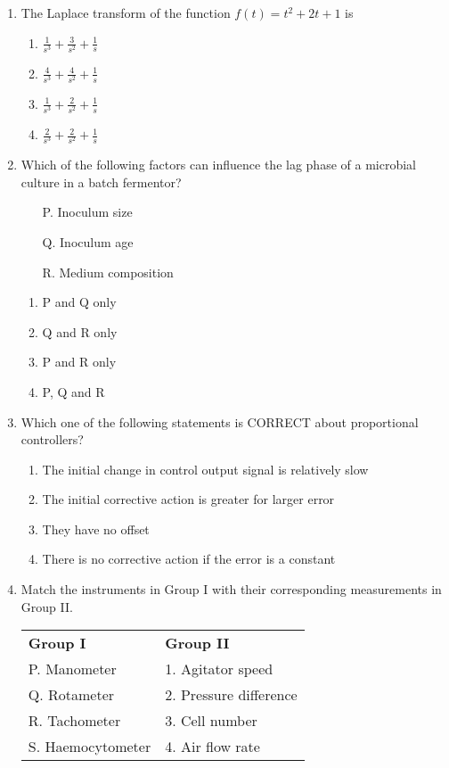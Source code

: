 \documentclass[12pt]{article}
\begin{document}
\begin{enumerate}[label=Q.\arabic*,start=26]
	\item The Laplace transform of the function $f(t) = t^2 + 2t + 1$ is
		\begin{enumerate}[label=(\Alph*)]
			\item $\frac{1}{s^3} + \frac{3}{s^2} + \frac{1}{s}$
			\item $\frac{4}{s^3} + \frac{4}{s^2} + \frac{1}{s}$
			\item $\frac{1}{s^3} + \frac{2}{s^2} + \frac{1}{s}$
			\item $\frac{2}{s^3} + \frac{2}{s^2} + \frac{1}{s}$
		\end{enumerate}

	\item Which of the following factors can influence the lag phase of a microbial culture in a batch fermentor?

		\begin{itemize}
			\item[P.] Inoculum size
			\item[Q.] Inoculum age
			\item[R.] Medium composition
		\end{itemize}

		\begin{enumerate}[label=(\Alph*)]
			\item P and Q only
			\item Q and R only
			\item P and R only
			\item P, Q and R
		\end{enumerate}
	\item Which one of the following statements is CORRECT about proportional controllers?
		\begin{enumerate}[label=(\Alph*)]
			\item The initial change in control output signal is relatively slow
			\item The initial corrective action is greater for larger error
			\item They have no offset
			\item There is no corrective action if the error is a constant
		\end{enumerate}

	\item Match the instruments in Group I with their corresponding measurements in Group II.

		\begin{center}
			\begin{tabular}{ll}
				\textbf{Group I} & \textbf{Group II} \\
				P. Manometer & 1. Agitator speed \\
				Q. Rotameter & 2. Pressure difference \\
				R. Tachometer & 3. Cell number \\
				S. Haemocytometer & 4. Air flow rate \\
			\end{tabular}
		\end{center}


\end{enumerate}
\end{document}
